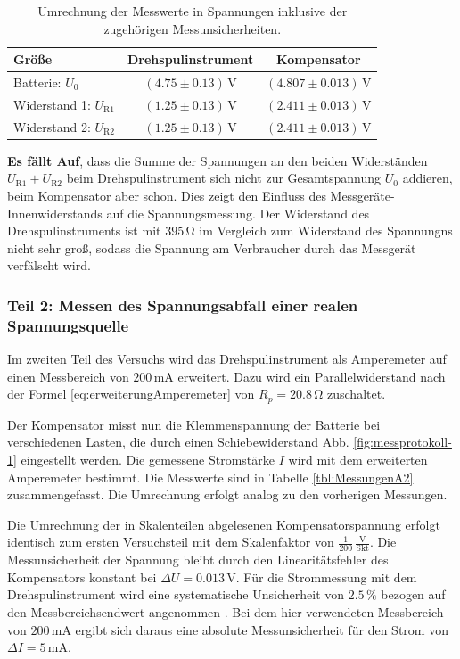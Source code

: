 \documentclass[12pt,a4paper,titlepage]{scrartcl}
\numberwithin{equation}{section}
\numberwithin{table}{section}
\numberwithin{figure}{section}
\begin{document}
\begin{table}[H]
    \centering
    \caption{Umrechnung der Messwerte in Spannungen inklusive der zugehörigen Messunsicherheiten.}
    \label{tab:spannungsteiler_umrechnung}
    \begin{tabular}{lcc}
        \toprule
        \textbf{Größe} & \textbf{Drehspulinstrument} & \textbf{Kompensator} \\
        \midrule
        Batterie: $U_0$ & $(4.75 \pm 0.13)\,\text{V}$ & $(4.807 \pm 0.013)\,\text{V}$ \\
        Widerstand 1: $U_\text{R1}$ & $(1.25 \pm 0.13)\,\text{V}$ & $(2.411 \pm 0.013)\,\text{V}$ \\
        Widerstand 2: $U_\text{R2}$ & $(1.25 \pm 0.13)\,\text{V}$ & $(2.411 \pm 0.013)\,\text{V}$ \\
        \bottomrule
    \end{tabular}   
\end{table}

\textbf{Es fällt Auf}, dass die Summe der Spannungen an den beiden Widerständen $U_\text{R1} + U_\text{R2}$ beim Drehspulinstrument sich nicht zur Gesamtspannung $U_0$ addieren,
beim Kompensator aber schon. Dies zeigt den Einfluss des Messgeräte-Innenwiderstands auf die Spannungsmessung. Der Widerstand des Drehspulinstruments ist mit $395\,\si{\ohm}$ im Vergleich zum
Widerstand des Spannungns nicht sehr groß, sodass die Spannung am Verbraucher durch das Messgerät verfälscht wird.

\subsubsection{Teil 2: Messen des Spannungsabfall einer realen Spannungsquelle}\label{sec:messungSpannungsabfall}
Im zweiten Teil des Versuchs wird das Drehspulinstrument als Amperemeter auf einen Messbereich von $200\,\text{mA}$ erweitert. Dazu wird ein Parallelwiderstand
nach der Formel \ref{eq:erweiterungAmperemeter} von $R_p = 20.8\,\si{\ohm}$ zuschaltet.

\medskip
Der Kompensator misst nun die Klemmenspannung der Batterie bei verschiedenen Lasten, die durch einen Schiebewiderstand Abb. \ref{fig:messprotokoll-1} eingestellt werden.
Die gemessene Stromstärke $I$ wird mit dem erweiterten Amperemeter bestimmt. Die Messwerte sind in Tabelle \ref{tbl:MessungenA2} zusammengefasst.
Die Umrechnung erfolgt analog zu den vorherigen Messungen.

Die Umrechnung der in Skalenteilen abgelesenen Kompensatorspannung erfolgt identisch zum ersten Versuchsteil mit dem Skalenfaktor von $\frac{1}{200}\,\frac{\text{V}}{\text{Skt}}$. 
Die Messunsicherheit der Spannung bleibt durch den Linearitätsfehler des Kompensators konstant bei $\Delta U = 0.013\,\text{V}$.
Für die Strommessung mit dem Drehspulinstrument wird eine systematische Unsicherheit von $2.5\,\%$ bezogen auf den Messbereichsendwert angenommen \cite{PAPskript}. Bei dem hier verwendeten
Messbereich von $200\,\si{\milli\ampere}$ ergibt sich daraus eine absolute Messunsicherheit für den Strom von $\Delta I = 5\,\si{\milli\ampere}$.
\end{document}

